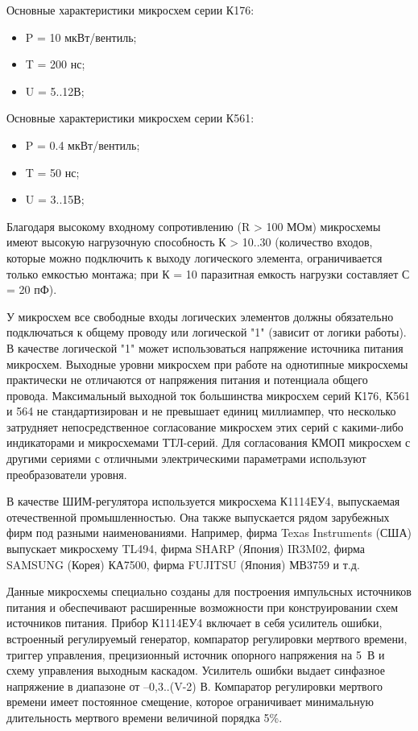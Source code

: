 Основные характеристики микросхем серии К176:
\begin{itemize}
	\item P = 10 мкВт/вентиль;
	\item T = 200 нс;
	\item U = 5..12В;
\end{itemize}

Основные характеристики микросхем серии К561:
\begin{itemize}
	\item P = 0.4 мкВт/вентиль;
	\item T = 50 нс;
	\item U = 3..15В;
\end{itemize}

Благодаря высокому входному сопротивлению (R > 100 МОм) микросхемы имеют высокую нагрузочную способность К > 10..30 (количество входов, которые можно подключить к выходу логического элемента, ограничивается только емкостью монтажа; при К = 10 паразитная емкость нагрузки составляет С = 20 пФ). 

У микросхем все свободные входы логических элементов должны обязательно подключаться к общему проводу или логической "1" (зависит от логики работы). В качестве логической "1" может использоваться напряжение источника питания микросхем. 
Выходные уровни микросхем при работе на однотипные микросхемы практически не отличаются от напряжения питания и потенциала общего провода. Максимальный выходной ток большинства микросхем серий К176, К561 и 564 не стандартизирован и не превышает единиц миллиампер, что несколько затрудняет непосредственное согласование микросхем этих серий с какими-либо индикаторами и микросхемами ТТЛ-серий. 
Для согласования КМОП микросхем с другими сериями с отличными электрическими параметрами используют преобразователи уровня. 

В качестве ШИМ-регулятора используется микросхема К1114ЕУ4, выпускаемая отечественной промышленностью. Она также выпускается рядом зарубежных фирм под разными наименованиями. Например, фирма Texas Instruments (США) выпускает микросхему TL494, фирма SHARP (Япония) \longndash IR3M02, фирма SAMSUNG (Корея) \longndash КА7500, фирма FUJITSU (Япония) \longndash МВ3759 и т.д.

Данные микросхемы специально созданы для построения импульсных источников питания и обеспечивают расширенные возможности при конструировании схем источников питания. Прибор К1114ЕУ4 включает в себя усилитель ошибки, встроенный регулируемый генератор, компаратор регулировки мертвого времени, триггер управления, прецизионный источник опорного напряжения на 5~В и схему управления выходным каскадом. Усилитель ошибки выдает синфазное напряжение в диапазоне от –0,3..(V-2) В. Компаратор регулировки мертвого времени имеет постоянное смещение, которое ограничивает минимальную длительность мертвого времени величиной порядка 5\%.

